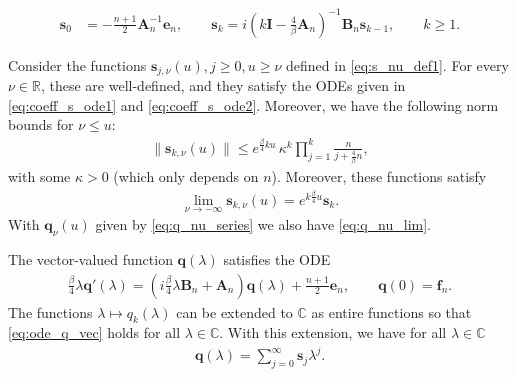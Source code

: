 \documentclass[10pt,a4paper]{amsart}
\newcommand{\CC}{{\mathbb C}}
\newcommand{\R}{{\mathbb R}}
\begin{document}
\begin{align}\label{eq:q_coeff_1}
    \mathbf{s}_0&=-\frac{n+1}{2}\mathbf{A}_n^{-1}\mathbf{e}_n, \qquad \mathbf{s}_k=i \left(k \mathbf{I}-\tfrac{4}{\beta} \mathbf{A}_n\right)^{-1} \mathbf{B}_n \mathbf{s}_{k-1}, \qquad k\ge 1.
\end{align}

\begin{lemma}\label{lem:coeff_s} Consider the functions $ \mathbf{s}_{j,\nu}(u), j\ge 0, u\ge \nu$ defined in \eqref{eq:s_nu_def1}. For every $\nu\in \R$, these are well-defined, and they satisfy the  ODEs given in \eqref{eq:coeff_s_ode1} and   \eqref{eq:coeff_s_ode2}. Moreover, we have the following norm bounds for $\nu\le u$:
\begin{align}\label{eq:coeff_norm_bound}
        \|\mathbf{s}_{k,\nu}(u)\|\le e^{\frac{\beta}{4} k u} \,  \kappa^k \prod_{j=1}^k\frac{n}{j+\frac{4}{\beta}n},
\end{align}
with some $\kappa>0$ (which only depends on $n$). 
Moreover, these functions satisfy 
\begin{align}\label{eq:coeff_nu_lim}
    \lim\limits_{\nu\to -\infty} \mathbf{s}_{k,\nu}(u)=e^{k \frac{\beta}{4}u} \mathbf{s}_{k}.
\end{align}
With $\mathbf{q}_{\nu}(u)$ given by \eqref{eq:q_nu_series} we also have \eqref{eq:q_nu_lim}.
\end{lemma}

\begin{theorem}\label{thm:even_beta}
 The vector-valued function $\mathbf{q}(\lambda)$ satisfies the ODE
 \begin{align}\label{eq:ode_q_vec}
     \frac{\beta}{4} \lambda \mathbf{q}'(\lambda) = (i \frac{\beta}{4}\lambda  \mathbf{B}_n   +\mathbf{A}_n) \mathbf{q}(\lambda)+\frac{n+1}{2} \mathbf{e}_n, \qquad \mathbf{q}(0)=\mathbf{f}_n.
\end{align}
The functions $\lambda\mapsto q_k(\lambda)$ can be extended to $\CC$ as entire functions  so that \eqref{eq:ode_q_vec} holds for all $\lambda\in \CC$. With this extension, we have for all $\lambda\in \CC$
\begin{align}\label{eq:q_expansion}
    \mathbf{q}(\lambda)=\sum_{j=0}^\infty \mathbf{s}_j \lambda^j.
\end{align} 
\end{theorem}
\end{document}
